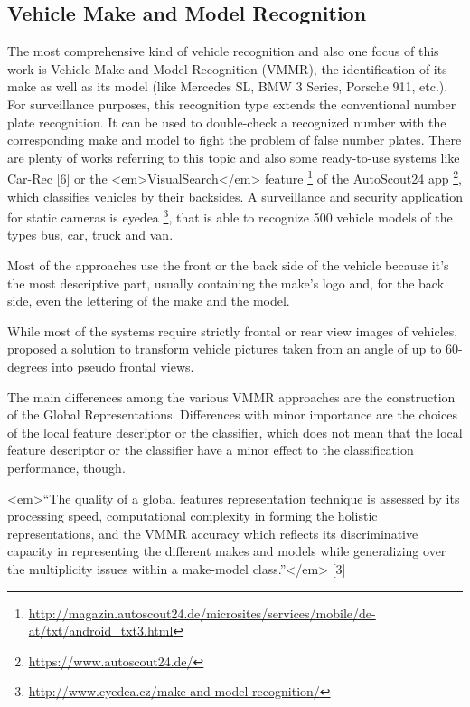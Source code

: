 \subsection{Vehicle Make and Model Recognition}\label{sec:vmmrStateOfTheArt}
The most comprehensive kind of vehicle recognition and also one focus of this work is Vehicle Make and Model Recognition (VMMR), the identification of its make as well as its model (like Mercedes SL, BMW 3 Series, Porsche 911, etc.). For surveillance purposes, this recognition type extends the conventional number plate recognition. It can be used to double-check a recognized number with the corresponding make and model to fight the problem of false number plates. There are plenty of works referring to this topic and also some ready-to-use systems like Car-Rec [6] or the <em>VisualSearch</em> feature \footnote{\url{http://magazin.autoscout24.de/microsites/services/mobile/de-at/txt/android_txt3.html}} of the AutoScout24 app \footnote{\url{https://www.autoscout24.de/}}, which classifies vehicles by their backsides.
A surveillance and security application for static cameras is eyedea \footnote{\url{http://www.eyedea.cz/make-and-model-recognition/}}, that is able to recognize 500 vehicle models of the types bus, car, truck and van.

Most of the approaches use the front or the back side of the vehicle because it’s the most descriptive part, usually containing the make’s logo and, for the back side, even the lettering of the make and the model.

While most of the systems require strictly frontal or rear view images of vehicles, \citeauthor{shinozuka2013vehicle} proposed a solution to transform vehicle pictures taken from an angle of up to 60-degrees into pseudo frontal views.

The main differences among the various VMMR approaches are the construction of the Global Representations. Differences with minor importance are the choices of the local feature descriptor or the classifier, which does not mean that the local feature descriptor or the classifier have a minor effect to the classification performance, though.

<em>“The quality of a global features representation technique is assessed by its processing speed, computational complexity in forming the holistic representations, and the VMMR accuracy which reflects its discriminative capacity in representing the different makes and models while generalizing over the multiplicity issues within a make-model class.”</em> [3]

